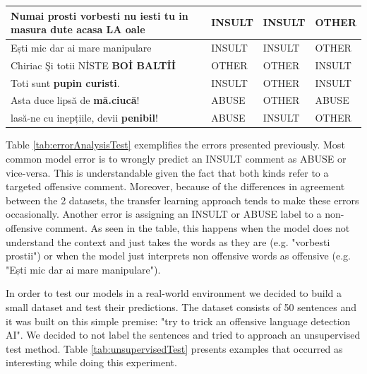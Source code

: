 \documentclass[12pt,a4paper]{report}
\begin{document}
\begin{table}[H]
\begin{tabular}{ p{6cm} | p{3cm} | p{3.5cm} | p{2.5cm} }
  Numai  \textbf{prosti vorbesti} nu iesti tu in masura dute acasa LA oale & INSULT & INSULT & OTHER\\\hline
  Ești mic dar ai mare manipulare & INSULT & INSULT & OTHER\\\hline
  Chiriac Şi totii NİSTE  \textbf{BOİ BALTİİ} & OTHER & OTHER & INSULT\\\hline
  Toti sunt  \textbf{pupin curisti}. & INSULT & OTHER & INSULT\\\hline
  Asta duce lipsă de \textbf{mă.ciucă}! & ABUSE & OTHER & ABUSE\\\hline
  lasă-ne cu inepțiile, devii \textbf{penibil}! & ABUSE & INSULT & OTHER\\\hline
\end{tabular}
\end{table}

Table \ref{tab:errorAnalysisTest} exemplifies the errors presented previously. Most common model error is to wrongly predict an INSULT comment as ABUSE or vice-versa. This is understandable given the fact that both kinds refer to a targeted offensive comment. Moreover, because of the differences in agreement between the 2 datasets, the transfer learning approach tends to make these errors occasionally. Another error is assigning an INSULT or ABUSE label to a non-offensive comment. As seen in the table, this happens when the model does not understand the context and just takes the words as they are (e.g. "vorbesti prostii") or when the model just interprets non offensive words as offensive (e.g. "Ești mic dar ai mare manipulare").

In order to test our models in a real-world environment we decided to build a small dataset and test their predictions. The dataset consists of 50 sentences and it was built on this simple premise: "try to trick an offensive language detection AI". We decided to not label the sentences and tried to approach an unsupervised test method. Table \ref{tab:unsupervisedTest} presents examples that occurred as interesting while doing this experiment.
\end{document}
